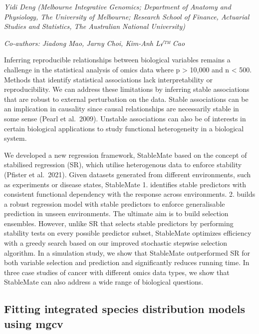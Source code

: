 \documentclass[
]{scrreprt}
\begin{document}
\emph{Yidi Deng} \emph{(Melbourne Integrative
Genomics; Department of Anatomy and Physiology, The University of
Melbourne; Research School of Finance, Actuarial Studies and Statistics,
The Australian National University)}

\emph{Co-authors: Jiadong Mao, Jarny Choi, Kim-Anh L√™ Cao}

\setlength{\parskip}{0.5em}

Inferring reproducible relationships between biological variables
remains a challenge in the statistical analysis of omics data where p
\textgreater{} 10,000 and n \textless{} 500. Methods that identify
statistical associations lack interpretability or reproducibility. We
can address these limitations by inferring stable associations that are
robust to external perturbation on the data. Stable associations can be
an implication in causality since causal relationships are necessarily
stable in some sense (Pearl et al.~2009). Unstable associations can also
be of interests in certain biological applications to study functional
heterogeneity in a biological system.

We developed a new regression framework, StableMate based on the concept
of stabilised regression (SR), which utilise heterogenous data to
enforce stability (Pfister et al.~2021). Given datasets generated from
different environments, such as experiments or disease states,
StableMate 1. identifies stable predictors with consistent functional
dependency with the response across environments. 2. builds a robust
regression model with stable predictors to enforce generalisable
prediction in unseen environments. The ultimate aim is to build
selection ensembles. However, unlike SR that selects stable predictors
by performing stability tests on every possible predictor subset,
StableMate optimizes efficiency with a greedy search based on our
improved stochastic stepwise selection algorithm. In a simulation study,
we show that StableMate outperformed SR for both variable selection and
prediction and significantly reduces running time. In three case studies
of cancer with different omics data types, we show that StableMate can
also address a wide range of biological questions.

\subsection{Fitting integrated species distribution models using
mgcv}\label{fitting-integrated-species-distribution-models-using-mgcv}
\end{document}
